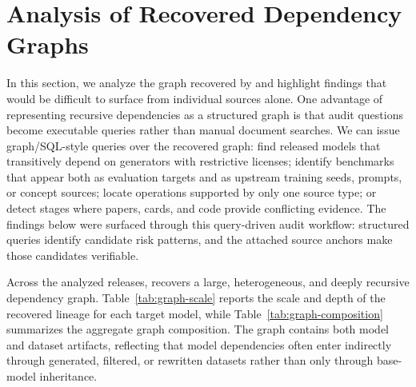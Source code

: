 
\section{Analysis of Recovered Dependency Graphs}\label{sec:findings}

In this section, we analyze the graph recovered by \system{} and highlight findings that would be difficult to surface from individual sources alone. One advantage of representing recursive dependencies as a structured graph is that audit questions become executable queries rather than manual document searches. We can issue graph/SQL-style queries over the recovered graph: find released models that transitively depend on generators with restrictive licenses; identify benchmarks that appear both as evaluation targets and as upstream training seeds, prompts, or concept sources; locate operations supported by only one source type; or detect stages where papers, cards, and code provide conflicting evidence. The findings below were surfaced through this query-driven audit workflow: structured queries identify candidate risk patterns, and the attached source anchors make those candidates verifiable.

Across the analyzed releases, \system{} recovers a large, heterogeneous, and deeply recursive dependency graph. Table~\ref{tab:graph-scale} reports the scale and depth of the recovered lineage for each target model, while Table~\ref{tab:graph-composition} summarizes the aggregate graph composition. The graph contains both model and dataset artifacts, reflecting that model dependencies often enter indirectly through generated, filtered, or rewritten datasets rather than only through base-model inheritance.

